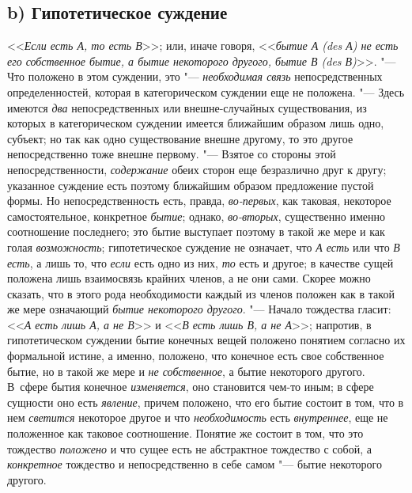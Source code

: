 \subsection[b) Гипотетическое суждение]{b) Гипотетическое суждение}
<<{\em Если есть А, то есть В}>>;
или, иначе говоря,
<<{\em бытие А (des А) не есть его
собственное бытие, а бытие некоторого другого, бытие В (des В)}>>. "---
Что положено в этом суждении, это
"--- {\em необходимая связь}
непосредственных определенностей, которая в категорическом
суждении еще не положена. "--- Здесь имеются
{\em два}
непосредственных или внешне-случайных существования, из
которых в категорическом суждении имеется ближайшим образом лишь одно,
субъект; но так как одно существование внешне другому, то это другое
непосредственно тоже внешне первому. "--- Взятое со стороны
этой непосредственности,
{\em содержание} обеих
сторон еще безразлично друг к другу; указанное суждение есть поэтому
ближайшим образом предложение пустой формы. Но непосредственность есть,
правда, {\em во-первых},
как таковая, некоторое самостоятельное, конкретное
{\em бытие}; однако,
{\em во-вторых},
существенно именно соотношение последнего; это бытие
выступает поэтому в такой же мере и как голая
{\em возможность};
гипотетическое суждение не означает, что
{\em А есть} или что
{\em В есть}, а лишь то,
что {\em если} есть одно
из них, {\em то} есть и
другое; в качестве сущей положена лишь взаимосвязь крайних членов, а не они
сами. Скорее можно сказать, что в этого рода необходимости каждый из членов
положен как в такой же мере означающий
{\em бытие некоторого другого}. "---
Начало тождества гласит:
<<{\em А есть лишь А, а не В}>>
и <<{\em В есть лишь В, а
не А}>>; напротив, в гипотетическом суждении бытие конечных
вещей положено понятием согласно их формальной истине, а именно, положено,
что конечное есть свое собственное бытие, но в такой же мере и
{\em не собственное}, а
бытие некоторого другого. В~сфере бытия конечное
{\em изменяется}, оно
становится чем-то иным; в сфере сущности оно есть
{\em явление}, причем
положено, что его бытие состоит в том, что в нем
{\em светится} некоторое
другое и что {\em необходимость}
есть {\em внутреннее},
еще не положенное как таковое соотношение. Понятие же состоит
в том, что это тождество {\em положено}
и что сущее есть не абстрактное тождество с собой, а
{\em конкретное}
тождество и непосредственно в себе самом
"--- бытие некоторого другого.

